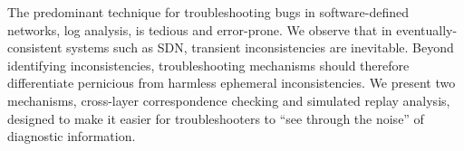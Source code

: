 The predominant technique for troubleshooting bugs in software-defined networks,
log analysis, is tedious and error-prone. We observe that
in eventually-consistent systems such as SDN,
transient inconsistencies are inevitable. Beyond identifying inconsistencies,
troubleshooting mechanisms should therefore differentiate
pernicious from harmless ephemeral inconsistencies. We present two
mechanisms, cross-layer correspondence checking and simulated replay analysis, 
designed to make it easier for troubleshooters to ``see through the noise'' of
diagnostic information.

